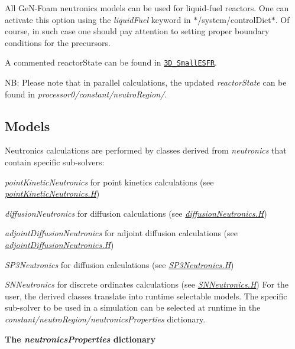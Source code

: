 All Ge\+N-\/\+Foam neutronics models can be used for liquid-\/fuel reactors. One can activate this option using the {\itshape liquid\+Fuel} keyword in $\ast$/system/control\+Dict$\ast$. Of course, in such case one should pay attention to setting proper boundary conditions for the precursors.

A commented reactor\+State can be found in \href{https://gitlab.com/foam-for-nuclear/GeN-Foam/-/tree/master/Tutorials/3D_SmallESFR/rootCase/constant/neutroRegion/reactorState}{\tt 3\+D\+\_\+\+Small\+E\+S\+FR}.

NB\+: Please note that in parallel calculations, the updated {\itshape reactor\+State} can be found in {\itshape processor0/constant/neutro\+Region/}. 

\subsection*{Models}

Neutronics calculations are performed by classes derived from {\itshape neutronics} that contain specific sub-\/solvers\+:
\begin{DoxyItemize}
\item {\itshape point\+Kinetic\+Neutronics} for point kinetics calculations (see {\itshape \hyperlink{pointKineticNeutronics_8H}{point\+Kinetic\+Neutronics.\+H}})
\item {\itshape diffusion\+Neutronics} for diffusion calculations (see {\itshape \hyperlink{diffusionNeutronics_8H}{diffusion\+Neutronics.\+H}})
\item {\itshape adjoint\+Diffusion\+Neutronics} for adjoint diffusion calculations (see {\itshape \hyperlink{adjointDiffusionNeutronics_8H}{adjoint\+Diffusion\+Neutronics.\+H}})
\item {\itshape S\+P3\+Neutronics} for diffusion calculations (see {\itshape \hyperlink{SP3Neutronics_8H}{S\+P3\+Neutronics.\+H}})
\item {\itshape S\+N\+Neutronics} for discrete ordinates calculations (see {\itshape \hyperlink{SNNeutronics_8H}{S\+N\+Neutronics.\+H}}) For the user, the derived classes translate into runtime selectable models. The specific sub-\/solver to be used in a simulation can be selected at runtime in the {\itshape constant/neutro\+Region/neutronics\+Properties} dictionary.
\end{DoxyItemize}

 {\bfseries The {\itshape neutronics\+Properties} dictionary}

